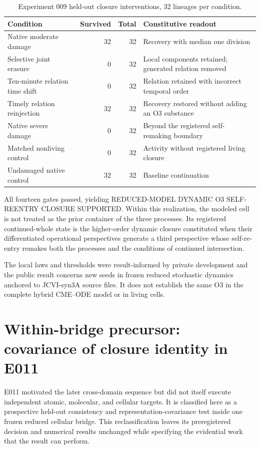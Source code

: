\documentclass[11pt,a4paper]{article}
\begin{document}
\begin{table}[H]
\centering
\footnotesize
\caption{Experiment 009 held-out closure interventions, 32 lineages per condition.}
\begin{tabularx}{\textwidth}{@{}>{\raggedright\arraybackslash}Xrr>{\raggedright\arraybackslash}p{5.0cm}@{}}
\toprule
Condition & Survived & Total & Constitutive readout \\
\midrule
Native moderate damage & 32 & 32 & Recovery with median one division \\
Selective joint erasure & 0 & 32 & Local components retained; generated relation removed \\
Ten-minute relation time shift & 0 & 32 & Relation retained with incorrect temporal order \\
Timely relation reinjection & 32 & 32 & Recovery restored without adding an O3 substance \\
Native severe damage & 0 & 32 & Beyond the registered self-remaking boundary \\
Matched nonliving control & 0 & 32 & Activity without registered living closure \\
Undamaged native control & 32 & 32 & Baseline continuation \\
\bottomrule
\end{tabularx}
\end{table}

All fourteen gates passed, yielding \textsf{REDUCED-MODEL DYNAMIC O3 SELF-REENTRY CLOSURE SUPPORTED}. Within this realization, the modeled cell is not treated as the prior container of the three processes. Its registered continued-whole state is the higher-order dynamic closure constituted when their differentiated operational perspectives generate a third perspective whose self-re-entry remakes both the processes and the conditions of continued intersection.

The local laws and thresholds were result-informed by private development and the public result concerns new seeds in frozen reduced stochastic dynamics anchored to JCVI-syn3A source files. It does not establish the same O3 in the complete hybrid CME--ODE model or in living cells.

\section{Within-bridge precursor: covariance of closure identity in E011}

E011 motivated the later cross-domain sequence but did not itself execute independent atomic, molecular, and cellular targets. It is classified here as a prospective held-out consistency and representation-covariance test inside one frozen reduced cellular bridge. This reclassification leaves its preregistered decision and numerical results unchanged while specifying the evidential work that the result can perform.
\end{document}
